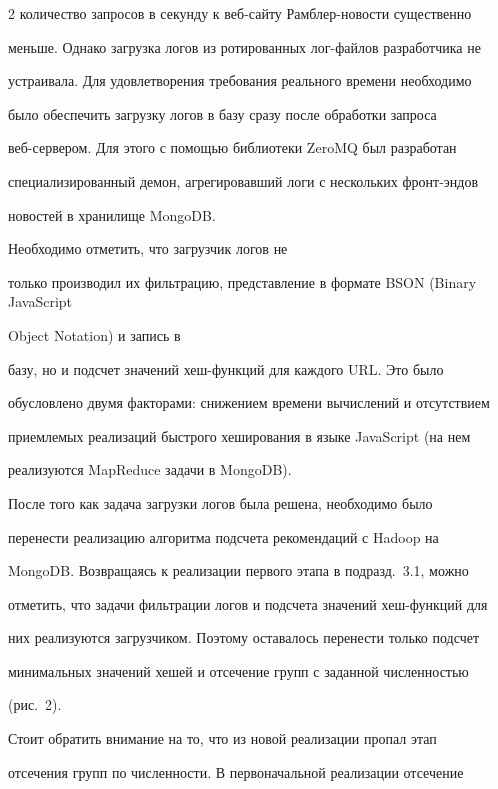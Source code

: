 \begin{multicols}{2}
количество запросов в секунду к веб-сай\-ту Рамб\-лер-но\-вости существенно 


меньше. Однако загрузка логов из ротированных лог-фай\-лов разработчика не 


устраивала. Для удовлетворения требования реального времени необходимо 


было обеспечить загрузку логов в базу сразу после обработки запроса 


   веб-сер\-ве\-ром. Для этого с помощью библиотеки ZeroMQ был разработан 


специализированный демон, агрегировавший логи с нескольких фронт-эндов 


новостей в хранилище MongoDB. 





Необходимо отметить, что загрузчик логов не 


только производил их фильтрацию, представление в формате BSON (Binary JavaScript


Object Notation) и запись в 


базу, но и подсчет значений хеш-функ\-ций для каждого URL. Это было 


обусловлено двумя факторами: снижением времени вычислений и отсутствием 


приемлемых реализаций быстрого хеширования в языке JavaScript (на нем 


реализуются MapReduce задачи в MongoDB).


   


   После того как задача загрузки логов была решена, необходимо было 


перенести реализацию алгоритма подсчета рекомендаций с Hadoop на 


MongoDB. Возвращаясь к реализации первого этапа в под\-разд.~3.1, можно 


отметить, что задачи фильтрации логов и подсчета значений хеш-функ\-ций для 


них реализуются загрузчиком. Поэтому оставалось перенести только подсчет 


минимальных значений хешей и отсечение групп с заданной численностью 


(рис.~2).





   Стоит обратить внимание на то, что из новой реализации пропал этап 


отсечения групп по численности. В первоначальной реализации отсечение 



\end{multicols}
